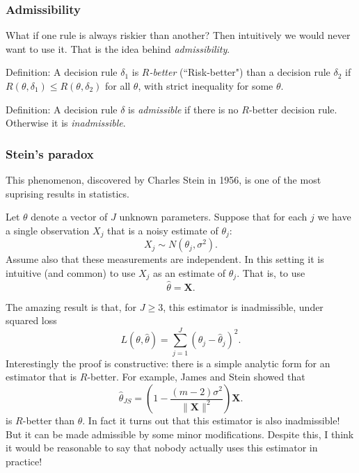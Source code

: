 \documentclass[12pt]{article}
\begin{document}
\subsubsection{Admissibility}

What if one rule is always riskier than another? Then intuitively we would
never want to use it. That is the idea behind {\it admissibility}.

\medskip
Definition:  A decision rule $\delta_1$ is {\it $R$-better} (``Risk-better") than
a decision rule $\delta_2$ if $R(\theta,\delta_1) \leq R(\theta,\delta_2)$ for all $\theta$, with strict inequality for some $\theta$.

\medskip
Definition: A decision rule $\delta$ is {\it admissible} if there is no $R$-better decision rule. Otherwise it is {\it inadmissible}.


\subsubsection*{Stein's paradox}

This phenomenon, discovered by Charles Stein in 1956, is one of the most suprising results in statistics.

Let $\theta$ denote a vector of $J$ unknown parameters. Suppose that for each $j$ we have a single observation $X_j$ that is a noisy estimate of $\theta_j$:
\begin{equation}
X_j \sim N(\theta_j, \sigma^2).
\end{equation}
Assume also that these measurements are independent. In this setting it is intuitive (and common) to use $X_j$ as an estimate of $\theta_j$.
That is, to use
\begin{equation}
\hat{\theta} = \mathbf X.
\end{equation}

The amazing result is that, for $J \geq 3$, this estimator is inadmissible, under squared loss
\begin{equation}
L(\theta,\hat{\theta})  = \sum_{j=1}^J (\theta_j - \hat{\theta}_j)^2.
\end{equation}
Interestingly the proof is constructive: there is a simple analytic form for an estimator that is $R$-better.
For example, James and Stein showed that
\begin{equation} \label{eqn:js}
\hat{\theta}_{JS} =  \left( 1 - \frac{(m-2) \sigma^2}{\|{\mathbf X}\|^2} \right) \mathbf X.
\end{equation}
is $R$-better than $\hat{\theta}$. In fact it turns out that this estimator is also inadmissible!
But it can be made admissible by some minor modifications.
Despite this, I think it would be reasonable to say that nobody actually uses this estimator in practice!
\end{document}
